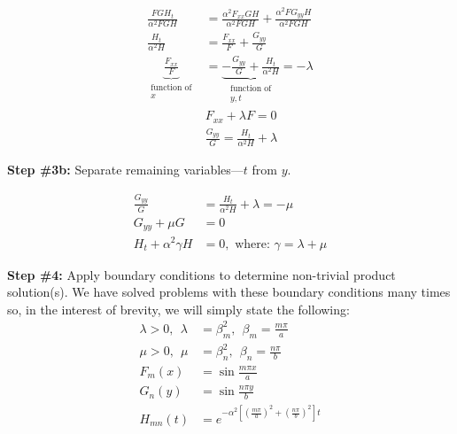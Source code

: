 \begin{align*}
\frac{FGH_t}{\alpha^2 FGH} &= \frac{\alpha^2 F_{xx}GH}{\alpha^2 FGH} + \frac{\alpha^2 FG_{yy}H}{\alpha^2 FGH} \\
\frac{H_t}{\alpha^2 H} &= \frac{F_{xx}}{F} + \frac{G_{yy}}{G} \\
\underbrace{\frac{F_{xx}}{F}}_{\substack{\text{function of} \\ x}} &= \underbrace{-\frac{G_{yy}}{G} + \frac{H_{t}}{\alpha^2 H}}_{\substack{\text{function of} \\ y,t}} = -\lambda \\
&F_{xx} + \lambda F = 0 \\
&\frac{G_{yy}}{G} = \frac{H_{t}}{\alpha^2 H} + \lambda
\end{align*}
\vspace{0.25cm}

\noindent\textbf{Step \#3b:} Separate remaining variables---$t$ from $y$.

\begin{align*}
\frac{G_{yy}}{G} &= \frac{H_{t}}{\alpha^2 H} + \lambda = -\mu \\
G_{yy} + \mu G &= 0 \\
H_{t} + \alpha^2\gamma H &= 0, \text{ where: } \gamma = \lambda + \mu
\end{align*}

\noindent\textbf{Step \#4:} Apply boundary conditions to determine non-trivial product solution(s).
We have solved problems with these boundary conditions many times so, in the interest of brevity, we will simply state the following:
\begin{align*}
\lambda > 0, \ \ \lambda &= \beta_{m}^2, \ \ \beta_m = \frac{m \pi}{a} \\
\mu>0, \ \ \mu &= \beta_n^2, \ \ \beta_n = \frac{n \pi}{b} \\
F_m(x) &= \sin{\frac{m \pi x}{a}} \\
G_n(y) &= \sin{\frac{n \pi y}{b}} \\
H_{mn}(t) &= e^{-\alpha^2\left[\left(\frac{m \pi}{a}\right)^2 + \left(\frac{n \pi}{b} \right)^2 \right]t} 
\end{align*}
\vspace{0.25cm}

